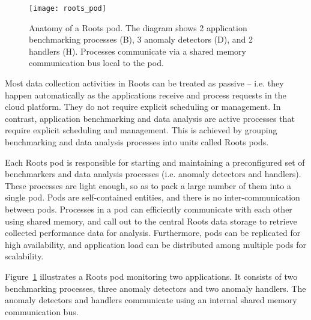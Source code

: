 \begin{figure}
\centering
\texttt{[image: roots\_pod]}
\caption{Anatomy of a Roots pod. The diagram shows 2 application benchmarking processes (B), 
3 anomaly detectors (D), and 2 handlers (H). Processes communicate via a shared
memory communication bus local to the pod.}
\label{fig:roots_pod}
\end{figure}
Most data collection activities in Roots can be treated as passive -- i.e. they
happen automatically as the applications receive and process requests in the cloud
platform. They do not require explicit scheduling or management. In contrast,
application benchmarking and data analysis are active processes that require
explicit scheduling and management.  This is achieved by grouping benchmarking
and data analysis processes into units called Roots pods. 

Each Roots pod is responsible for starting and maintaining a preconfigured set of
benchmarkers and data analysis processes (i.e. anomaly detectors and handlers). 
These processes are light enough, so as to pack a large number of them
into a single pod. Pods are self-contained entities, and there is no inter-communication
between pods. Processes in a pod can efficiently communicate with each other 
using shared memory, and call out to the central Roots data storage to retrieve 
collected performance data for analysis. 
Furthermore, pods
can be replicated for high availability, and application load can be distributed
among multiple pods for scalability.

Figure~\ref{fig:roots_pod} illustrates a Roots pod monitoring two applications.
It consists of two benchmarking processes, three anomaly detectors and 
two anomaly handlers. The anomaly detectors and handlers communicate
using an internal shared memory communication bus. 

